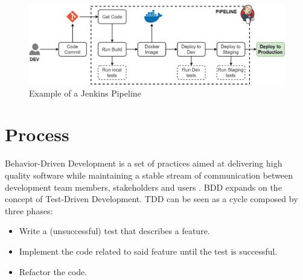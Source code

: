 \begin{figure}[ht]
	\centering
	\includegraphics[scale=0.5]{Images/JenkisPipeline.pdf}
	\caption{Example of a Jenkins Pipeline}
	\label{fig:jenkinsPipeline}
\end{figure}

\section{Process} 

Behavior-Driven Development \cite{BDD} is a set of practices aimed at delivering high quality software while maintaining a stable stream of communication between development team members, stakeholders and users \cite[p.~12]{BDD}. BDD expands on the concept of Test-Driven Development. TDD can be seen as a cycle composed by three phases:

\begin{itemize}
    \item Write a (unsuccessful) test that describes a feature.
    \item Implement the code related to said feature until the test is successful.
    \item Refactor the code.
\end{itemize}

